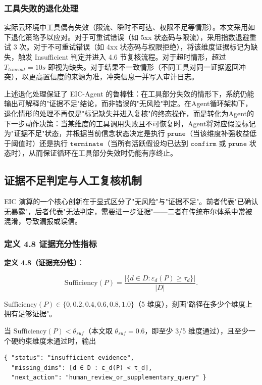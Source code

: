 \documentclass[a4paper,12pt]{ctexart}
\begin{document}
\subsubsection{工具失败的退化处理}

实际云环境中工具偶有失效（限流、瞬时不可达、权限不足等情形）。本文采用如下退化策略予以应对。对于可重试错误（如 5xx 状态码与限流），采用指数退避重试 3 次。对于不可重试错误（如 4xx 状态码与权限拒绝），将该维度证据标记为缺失，触发 Insufficient 判定并进入 4.6 节复核流程。对于超时情形，超过 $T_{timeout}=10s$ 即视为缺失。对于结果不一致情形（不同工具对同一证据返回冲突），以更高置信度的来源为准，冲突信息一并写入审计日志。

上述退化处理保证了 EIC-Agent 的鲁棒性：在工具部分失效的情形下，系统仍能输出可解释的"证据不足"结论，而非错误的"无风险"判定。在Agent循环架构下，退化情形的处理不再仅是"标记缺失并进入复核"的终态操作，而是转化为Agent的下一步动作决策：当某维度的工具调用失败且不可恢复时，Agent将对应假设标记为"证据不足"状态，并根据当前信念状态决定是执行 $\texttt{prune}$（当该维度补强收益低于阈值时）还是执行 $\texttt{terminate}$（当所有活跃假设均已达到 $\texttt{confirm}$ 或 $\texttt{prune}$ 状态时），从而保证循环在工具部分失效时仍能有序终止。

\subsection{证据不足判定与人工复核机制}

EIC 演算的一个核心创新在于显式区分了"无风险"与"证据不足"。前者代表"已确认无暴露"，后者代表"无法判定，需要进一步证据"——二者在传统布尔体系中常被混淆，导致漏报或误信。

\subsubsection{定义 4.8 证据充分性指标}

\textbf{定义 4.8（证据充分性）}：

\[
\text{Sufficiency}(P) = \frac{\left|\{ d \in D : \varepsilon_d(P) \geq \tau_d \}\right|}{|D|}.
\]

$\text{Sufficiency}(P) \in \{0, 0.2, 0.4, 0.6, 0.8, 1.0\}$（5 维度），刻画"路径在多少个维度上拥有足够证据"。

当 $\text{Sufficiency}(P) < \theta_{suf}$（本文取 $\theta_{suf} = 0.6$，即至少 3/5 维度通过），且至少一个硬约束维度未通过时，输出

\begin{verbatim}
{ "status": "insufficient_evidence",
  "missing_dims": [d ∈ D : ε_d(P) < τ_d],
  "next_action": "human_review_or_supplementary_query" }
\end{verbatim}
\end{document}
